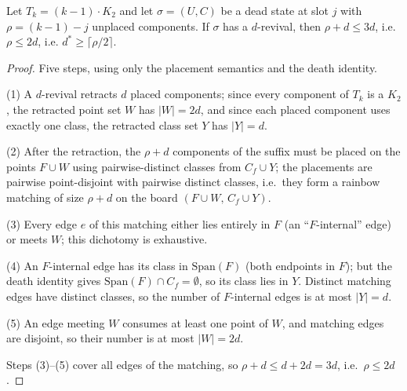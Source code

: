 \begin{theorem}\label{thm:clarevdepth}
Let $T_k=(k-1)\cdot K_2$ and let $\sigma=(U,C)$ be a dead state at slot
$j$ with $\rho=(k-1)-j$ unplaced components. If $\sigma$ has a
$d$-revival, then $\rho+d\le3d$, i.e.\ $\rho\le2d$, i.e.
$d^*\ge\lceil\rho/2\rceil$.
\end{theorem}

\begin{proof}
Five steps, using only the placement semantics and the death identity.

(1) A $d$-revival retracts $d$ placed components; since every component of
$T_k$ is a $K_2$, the retracted point set $W$ has $|W|=2d$, and since each
placed component uses exactly one class, the retracted class set $Y$ has
$|Y|=d$.

(2) After the retraction, the $\rho+d$ components of the suffix must be
placed on the points $F\cup W$ using pairwise-distinct classes from
$C_f\cup Y$; the placements are pairwise point-disjoint with pairwise
distinct classes, i.e.\ they form a rainbow matching of size $\rho+d$ on
the board $(F\cup W,\,C_f\cup Y)$.

(3) Every edge $e$ of this matching either lies entirely in $F$ (an
``$F$-internal'' edge) or meets $W$; this dichotomy is exhaustive.

(4) An $F$-internal edge has its class in $\mathrm{Span}(F)$ (both
endpoints in $F$); but the death identity gives
$\mathrm{Span}(F)\cap C_f=\emptyset$, so its class lies in $Y$. Distinct
matching edges have distinct classes, so the number of $F$-internal edges
is at most $|Y|=d$.

(5) An edge meeting $W$ consumes at least one point of $W$, and matching
edges are disjoint, so their number is at most $|W|=2d$.

Steps (3)--(5) cover all edges of the matching, so
$\rho+d\le d+2d=3d$, i.e.\ $\rho\le2d$.
\end{proof}

